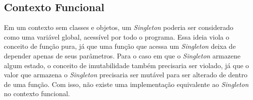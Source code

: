 \subsection*{Contexto Funcional}

Em um contexto sem classes e objetos, 
um \textit{Singleton} poderia ser considerado como 
uma variável global, acessível por 
todo o programa. Essa ideia viola o conceito 
de função pura, já que uma função que acessa 
um \textit{Singleton} deixa de depender apenas de seus 
parâmetros. Para o caso em que o \textit{Singleton} 
armazene algum estado, o conceito de imutabilidade 
também precisaria ser violado, já que o 
valor que armazena o \textit{Singleton} precisaria ser 
mutável para ser alterado de dentro de uma 
função. Com isso, não existe uma implementação 
equivalente ao \textit{Singleton} no contexto funcional.
